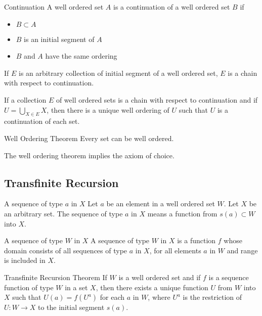 \begin{defn}{Continuation}{} A well ordered set $A$ is a continuation of a well ordered set $B$ if
\begin{itemize}
\item $B\subset A$
\item $B$ is an initial segment of $A$
\item $B$ and $A$ have the same ordering
\end{itemize}
\end{defn}

\begin{thm}{}{} If $E$ is an arbitrary collection of initial segment of a well ordered set, $E$ is a chain with respect to continuation. 
\end{thm}

\begin{thm}{}{} If a collection $E$ of well ordered sets is a chain with respect to continuation and if $U=\bigcup_{X\in E}X$, then there is a unique well ordering of $U$ such that $U$ is a continuation of each set. 
\end{thm}

\begin{thm}{Well Ordering Theorem}{} Every set can be well ordered. 
\end{thm}

\begin{prp}{}{} The well ordering theorem implies the axiom of choice. 
\end{prp}

\subsection{Transfinite Recursion}
\begin{defn}{A sequence of type $a$ in $X$}{} Let $a$ be an element in a well ordered set $W$. Let $X$ be an arbitrary set. The sequence of type $a$ in $X$ means a function from $s(a)\subset W$ into $X$. 
\end{defn}

\begin{defn}{A sequence of type $W$ in $X$}{} A sequence of type $W$ in $X$ is a function $f$ whose domain consists of all sequences of type $a$ in $X$, for all elements $a$ in $W$ and range is included in $X$. 
\end{defn}

\begin{thm}{Transfinite Recursion Theorem}{} If $W$ is a well ordered set and if $f$ is a sequence function of type $W$ in a set $X$, then there exists a unique function $U$ from $W$ into $X$ such that $U(a)=f(U^a)$ for each $a$ in $W$, where $U^a$ is the restriction of $U:W\to X$ to the initial segment $s(a)$. 
\end{thm}

